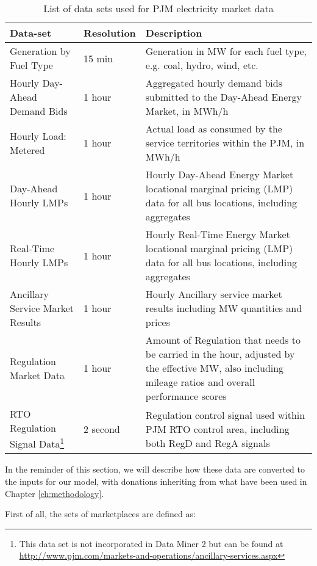 \begin{table}
	\footnotesize
	\centering
	\begin{tabular}{L{5cm} L{2cm} L{6cm} }
		\hline
		 \textbf{Data-set} & \textbf{Resolution} & \textbf{Description} \\
		 \hline
		 \hline
		 Generation by Fuel Type & 15 min & Generation in MW for each fuel type, e.g. coal, hydro, wind, etc. \\
		 \hline
		 Hourly Day-Ahead Demand Bids & 1 hour & Aggregated hourly demand bids submitted to the Day-Ahead Energy Market, in MWh/h \\
		 \hline
		 Hourly Load: Metered & 1 hour & Actual load as consumed by the service territories within the PJM, in MWh/h \\
		 \hline
		 Day-Ahead Hourly LMPs & 1 hour & Hourly Day-Ahead Energy Market locational marginal pricing (LMP) data for all bus locations, including aggregates \\
		 \hline
		 Real-Time Hourly LMPs & 1 hour & Hourly Real-Time Energy Market locational marginal pricing (LMP) data for all bus locations, including aggregates\\
		 \hline
		 Ancillary Service Market Results & 1 hour & Hourly Ancillary service market results including MW quantities and prices\\
		 \hline
		 Regulation Market Data & 1 hour & Amount of Regulation that needs to be carried in the hour, adjusted by the effective MW, also including mileage ratios and overall performance scores \\
		 \hline
		 RTO Regulation Signal Data\footnote{This data set is not incorporated in Data Miner 2 but can be found at \url{http://www.pjm.com/markets-and-operations/ancillary-services.aspx}} & 2 second& Regulation control signal used within PJM RTO control area, including both RegD and RegA signals\\
		 \hline
	\end{tabular}
\caption{List of data sets used for PJM electricity market data}\label{tab:pjm-data}
\end{table}

In the reminder of this section, we will describe how these data are converted to the inputs for our model, with donations inheriting from what have been used in Chapter \ref{ch:methodology}.

First of all, the sets of marketplaces are defined as:

